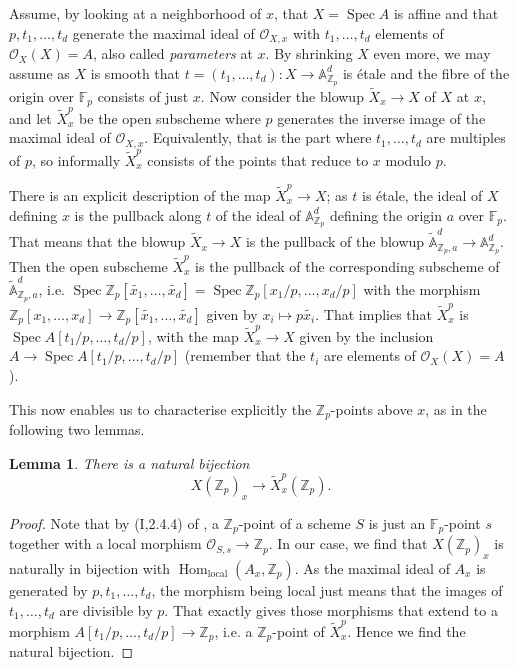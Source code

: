 \documentclass[12pt]{article}
\newcommand{\A}{\mathbb{A}}
\newcommand{\Z}{\mathbb{Z}}
\renewcommand{\O}{\mathcal{O}}
\newcommand{\F}{\mathbb{F}}
\DeclareMathOperator{\Hom}{Hom}
\DeclareMathOperator{\Spec}{Spec}
\theoremstyle{plain}
\newtheorem{lem}[thm]{Lemma} %
\theoremstyle{definition}
\theoremstyle{remark}
\begin{document}
Assume, by looking at a neighborhood of $x$, that $X = \Spec A$ is affine and that $p,t_1,\dots,t_d$ generate the maximal ideal of $\O_{X,x}$ with $t_1,\dots,t_d$ elements of $\O_X(X) = A$, also called \textit{parameters} at $x$. By shrinking $X$ even more, we may assume as $X$ is smooth that $t = (t_1,\dots,t_d): X \to \A^d_{\Z_p}$ is \'etale and the fibre of the origin over $\F_p$ consists of just $x$. Now consider the blowup $\widetilde{X}_x \to X$ of $X$ at $x$, and let $\widetilde{X}_x^p$ be the open subscheme where $p$ generates the inverse image of the maximal ideal of $\O_{X,x}$. Equivalently, that is the part where $t_1,\dots,t_d$ are multiples of $p$, so informally $\widetilde{X}_x^p$ consists of the points that reduce to $x$ modulo $p$.

There is an explicit description of the map $\widetilde{X}_x^p \to X$; as $t$ is \'etale, the ideal of $X$ defining $x$ is the pullback along $t$ of the ideal of $\A^d_{\Z_p}$ defining the origin $a$ over $\F_p$. That means that the blowup $\widetilde{X}_x \to X$ is the pullback of the blowup $\widetilde{\A}^d_{\Z_p,a} \to \A_{\Z_p}^d$. Then the open subscheme $\widetilde{X}_x^p$ is the pullback of the corresponding subscheme of $\widetilde{\A}^d_{\Z_p,a}$, i.e. $\Spec \Z_p[\widetilde{x_1},\dots,\widetilde{x_d}] = \Spec \Z_p[x_1/p,\dots,x_d/p]$ with the morphism $\Z_p[x_1,\dots,x_d] \to \Z_p[\widetilde{x_1},\dots,\widetilde{x_d}]$ given by $x_i \mapsto p\widetilde{x_i}$. That implies that $\widetilde{X}_x^p$ is $\Spec A[t_1/p,\dots,t_d/p]$, with the map $\widetilde{X}_x^p \to X$ given by the inclusion $A \to \Spec A[t_1/p,\dots,t_d/p]$ (remember that the $t_i$ are elements of $\O_X(X) = A$).

This now enables us to characterise explicitly the $\Z_p$-points above $x$, as in the following two lemmas.

\begin{lem}
There is a natural bijection \[X(\Z_p)_x \to \widetilde{X}_x^p(\Z_p).\]
\end{lem}
\begin{proof}
Note that by (I,2.4.4) of \cite{ega}, a $\Z_p$-point of a scheme $S$ is just an $\F_p$-point $s$ together with a local morphism $\O_{S,s} \to \Z_p$. In our case, we find that $X(\Z_p)_x$ is naturally in bijection with $\Hom_{\text{local}}(A_x,\Z_p)$. As the maximal ideal of $A_x$ is generated by $p,t_1,\dots,t_d$, the morphism being local just means that the images of $t_1,\dots,t_d$ are divisible by $p$. That exactly gives those morphisms that extend to a morphism $A[t_1/p,\dots,t_d/p] \to \Z_p$, i.e. a $\Z_p$-point of $\widetilde{X}_x^p$. Hence we find the natural bijection.
\end{proof}
\end{document}
